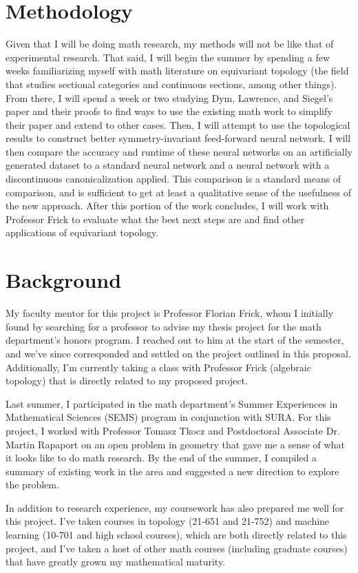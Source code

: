 \documentclass[12pt]{article}
\begin{document}
\section{Methodology}
Given that I will be doing math research, my methods will not be like that of experimental research.
That said, I will begin the summer by spending a few weeks familiarizing myself with math literature on equivariant topology (the field that studies sectional categories and continuous sections, among other things).
From there, I will spend a week or two studying Dym, Lawrence, and Siegel's paper and their proofs to find ways to use the existing math work to simplify their paper and extend to other cases.
Then, I will attempt to use the topological results to construct better symmetry-invariant feed-forward neural network.
I will then compare the accuracy and runtime of these neural networks on an artificially generated dataset to a standard neural network and a neural network with a discontinuous canonicalization applied.
This comparison is a standard means of comparison, and is sufficient to get at least a qualitative sense of the usefulness of the new approach.
After this portion of the work concludes, I will work with Professor Frick to evaluate what the best next steps are and find other applications of equivariant topology.

\section{Background}
My faculty mentor for this project is Professor Florian Frick, whom I initially found by searching for a professor to advise my thesis project for the math department’s honors program. I reached out to him at the start of the semester, and we’ve since corresponded and settled on the project outlined in this proposal. Additionally, I’m currently taking a class with Professor Frick (algebraic topology) that is directly related to my proposed project.

Last summer, I participated in the math department’s Summer Experiences in Mathematical Sciences (SEMS) program in conjunction with SURA. For this project, I worked with Professor Tomasz Tkocz and Postdoctoral Associate Dr. Martin Rapaport on an open problem in geometry that gave me a sense of what it looks like to do math research. By the end of the summer, I compiled a summary of existing work in the area and suggested a new direction to explore the problem.

In addition to research experience, my coursework has also prepared me well for this project. I've taken courses in topology (21-651 and 21-752) and machine learning (10-701 and high school courses), which are both directly related to this project, and I've taken a host of other math courses (including graduate courses) that have greatly grown my mathematical maturity.
\end{document}
